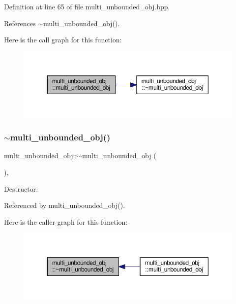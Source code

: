 Definition at line 65 of file multi\+\_\+unbounded\+\_\+obj.\+hpp.



References $\sim$multi\+\_\+unbounded\+\_\+obj().

Here is the call graph for this function\+:
\nopagebreak
\begin{figure}[H]
\begin{center}
\leavevmode
\includegraphics[width=350pt]{d0/d76/classmulti__unbounded__obj_a38f08a84f08beb0c7d1860bd9bd29812_cgraph}
\end{center}
\end{figure}
\mbox{\label{classmulti__unbounded__obj_abedcaa36fbd515da531d18fb56206066}} 
\subsubsection{\texorpdfstring{$\sim$multi\+\_\+unbounded\+\_\+obj()}{~multi\_unbounded\_obj()}}
{\footnotesize\ttfamily multi\+\_\+unbounded\+\_\+obj\+::$\sim$multi\+\_\+unbounded\+\_\+obj (\begin{DoxyParamCaption}{ }\end{DoxyParamCaption})\hspace{0.3cm}{\ttfamily [override]}, {\ttfamily [default]}}



Destructor. 



Referenced by multi\+\_\+unbounded\+\_\+obj().

Here is the caller graph for this function\+:
\nopagebreak
\begin{figure}[H]
\begin{center}
\leavevmode
\includegraphics[width=350pt]{d0/d76/classmulti__unbounded__obj_abedcaa36fbd515da531d18fb56206066_icgraph}
\end{center}
\end{figure}


